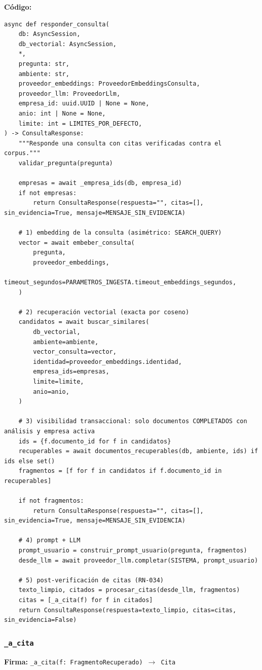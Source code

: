 \documentclass[11pt,a4paper]{article}
\begin{document}
\textbf{Código:}
\begin{lstlisting}
async def responder_consulta(
    db: AsyncSession,
    db_vectorial: AsyncSession,
    *,
    pregunta: str,
    ambiente: str,
    proveedor_embeddings: ProveedorEmbeddingsConsulta,
    proveedor_llm: ProveedorLlm,
    empresa_id: uuid.UUID | None = None,
    anio: int | None = None,
    limite: int = LIMITES_POR_DEFECTO,
) -> ConsultaResponse:
    """Responde una consulta con citas verificadas contra el corpus."""
    validar_pregunta(pregunta)

    empresas = await _empresa_ids(db, empresa_id)
    if not empresas:
        return ConsultaResponse(respuesta="", citas=[], sin_evidencia=True, mensaje=MENSAJE_SIN_EVIDENCIA)

    # 1) embedding de la consulta (asimétrico: SEARCH_QUERY)
    vector = await embeber_consulta(
        pregunta,
        proveedor_embeddings,
        timeout_segundos=PARAMETROS_INGESTA.timeout_embeddings_segundos,
    )

    # 2) recuperación vectorial (exacta por coseno)
    candidatos = await buscar_similares(
        db_vectorial,
        ambiente=ambiente,
        vector_consulta=vector,
        identidad=proveedor_embeddings.identidad,
        empresa_ids=empresas,
        limite=limite,
        anio=anio,
    )

    # 3) visibilidad transaccional: solo documentos COMPLETADOS con análisis y empresa activa
    ids = {f.documento_id for f in candidatos}
    recuperables = await documentos_recuperables(db, ambiente, ids) if ids else set()
    fragmentos = [f for f in candidatos if f.documento_id in recuperables]

    if not fragmentos:
        return ConsultaResponse(respuesta="", citas=[], sin_evidencia=True, mensaje=MENSAJE_SIN_EVIDENCIA)

    # 4) prompt + LLM
    prompt_usuario = construir_prompt_usuario(pregunta, fragmentos)
    desde_llm = await proveedor_llm.completar(SISTEMA, prompt_usuario)

    # 5) post-verificación de citas (RN-034)
    texto_limpio, citados = procesar_citas(desde_llm, fragmentos)
    citas = [_a_cita(f) for f in citados]
    return ConsultaResponse(respuesta=texto_limpio, citas=citas, sin_evidencia=False)
\end{lstlisting}

\subsubsection*{\texttt{\_a\_cita}}
\textbf{Firma:} \texttt{\_a\_cita(f: FragmentoRecuperado) $\rightarrow$ Cita}
\end{document}
